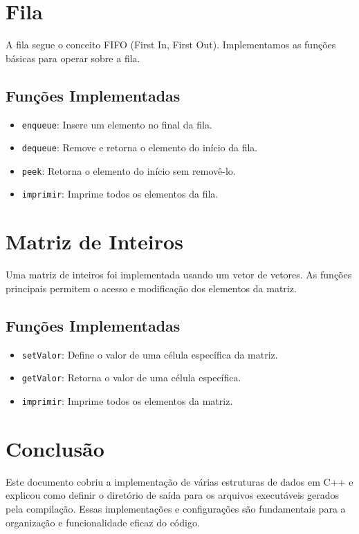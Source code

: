 \documentclass{article}
\begin{document}
\section{Fila}
A fila segue o conceito FIFO (First In, First Out). Implementamos as funções básicas para operar sobre a fila.

\subsection{Funções Implementadas}
\begin{itemize}
    \item \texttt{enqueue}: Insere um elemento no final da fila.
    \item \texttt{dequeue}: Remove e retorna o elemento do início da fila.
    \item \texttt{peek}: Retorna o elemento do início sem removê-lo.
    \item \texttt{imprimir}: Imprime todos os elementos da fila.
\end{itemize}

\section{Matriz de Inteiros}
Uma matriz de inteiros foi implementada usando um vetor de vetores. As funções principais permitem o acesso e modificação dos elementos da matriz.

\subsection{Funções Implementadas}
\begin{itemize}
    \item \texttt{setValor}: Define o valor de uma célula específica da matriz.
    \item \texttt{getValor}: Retorna o valor de uma célula específica.
    \item \texttt{imprimir}: Imprime todos os elementos da matriz.
\end{itemize}

\section{Conclusão}
Este documento cobriu a implementação de várias estruturas de dados em C++ e explicou como definir o diretório de saída para os arquivos executáveis gerados pela compilação. Essas implementações e configurações são fundamentais para a organização e funcionalidade eficaz do código.
\end{document}
